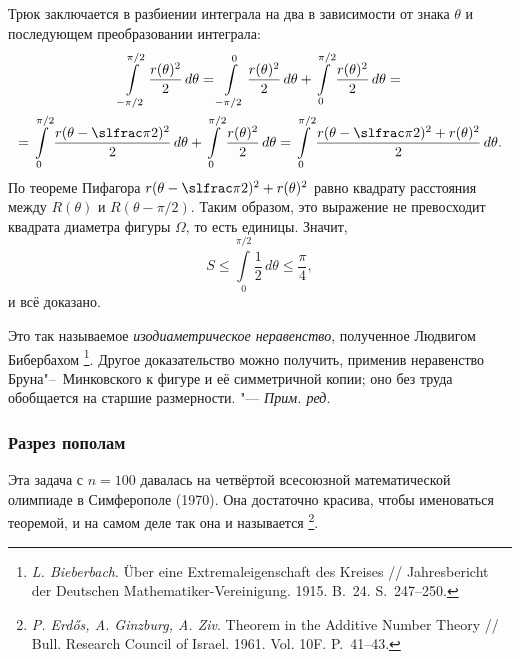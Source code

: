 \documentclass[twoside]{book}
\newenvironment{addedbytheeditors}{\par\medskip\small
}{\par\addvspace{\medskipamount}} %
\begin{document}
Трюк заключается в разбиении интеграла на два в зависимости от знака $\theta$ и последующем преобразовании интеграла:
\begin{multline*}
\int\limits_{-\pi/2}^{\pi/2}\frac{r(\theta)^2}{2}\,d\theta
=\int\limits_{-\pi/2}^{0}\frac{r(\theta)^2}{2}\,d\theta+\int\limits_{0}^{\pi/2}\frac{r(\theta)^2}{2}\,d\theta=
\\
=\int\limits_{0}^{\pi/2}\frac{r(\theta-\slfrac\pi2)^2}{2}\,d\theta+\int\limits_{0}^{\pi/2}\frac{r(\theta)^2}{2}\,d\theta=
\int\limits_{0}^{\pi/2}\frac{r(\theta-\slfrac\pi2)^2+r(\theta)^2}{2}\,d\theta.
\end{multline*}
По теореме Пифагора $r(\theta-\slfrac\pi2)^2+r(\theta)^2$ равно квадрату расстояния между $R(\theta)$ и $R(\theta- \pi/2)$.
Таким образом, это выражение не превосходит квадрата диаметра фигуры
$\Omega$, то есть единицы.
Значит,
\[S\le \int\limits_{0}^{\pi/2}\frac12\,d\theta\le\frac\pi4,
\]
и всё доказано.
\heart

\begin{addedbytheeditors}
Это так называемое \emph{изодиаметрическое неравенство}, полученное Людвигом Бибербахом%
\footnote{\emph{L. Bieberbach}. Über eine Extremaleigenschaft des Kreises /\!/ {Jahresbericht der Deutschen   Mathematiker-Vereinigung}. 1915. B.~24. S.~247--250.}.
Другое
доказательство можно получить, применив неравенство
Бруна"--~Минковского к фигуре и её симметричной копии; оно без труда
обобщается на старшие размерности.
"--- \emph{Прим. ред.}  
\end{addedbytheeditors}

\subsubsection*{Разрез пополам}

Эта задача с $n=100$ давалась на четвёртой всесоюзной математической
олимпиаде в Симферополе (1970).
Она достаточно красива, чтобы именоваться теоремой, и на самом деле
так она  и называется%
\footnote{\emph{P. Erd\H{o}s, A. Ginzburg, A. Ziv}. Theorem in the Additive Number Theory /\!/ {Bull. Research Council of Israel}. 1961. Vol. 10F. P.~41--43.}.

\medskip
\end{document}

